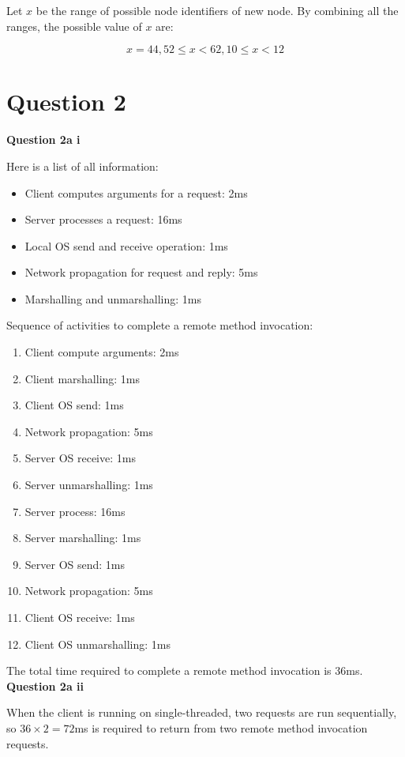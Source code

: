 \documentclass[11pt,a4paper]{report}
\begin{document}
\begin{multicols*}{2}
\noindent Let $x$ be the range of possible node identifiers of new node. By combining all the ranges, the possible value of $x$ are:

$$x=44,52\le x<62, 10 \le x < 12$$

\section{Question 2}

\noindent \textbf{Question 2a i}

\noindent Here is a list of all information:
\begin{itemize}
  \item Client computes arguments for a request: 2ms
  \item Server processes a request: 16ms
  \item Local OS send and receive operation: 1ms
  \item Network propagation for request and reply: 5ms
  \item Marshalling and unmarshalling: 1ms
\end{itemize}

\noindent Sequence of activities to complete a remote method invocation:
\begin{enumerate}
  \item Client compute arguments: 2ms
  \item Client marshalling: 1ms
  \item Client OS send: 1ms
  \item Network propagation: 5ms
  \item Server OS receive: 1ms
  \item Server unmarshalling: 1ms
  \item Server process: 16ms
  \item Server marshalling: 1ms
  \item Server OS send: 1ms
  \item Network propagation: 5ms
  \item Client OS receive: 1ms
  \item Client OS unmarshalling: 1ms
\end{enumerate}

\noindent The total time required to complete a remote method invocation is 36ms.\\

\noindent \textbf{Question 2a ii}

\noindent When the client is running on single-threaded, two requests are run sequentially, so $36 \times 2 =72$ms is required to return from two remote method invocation requests.\\


\end{multicols*}
\end{document}
